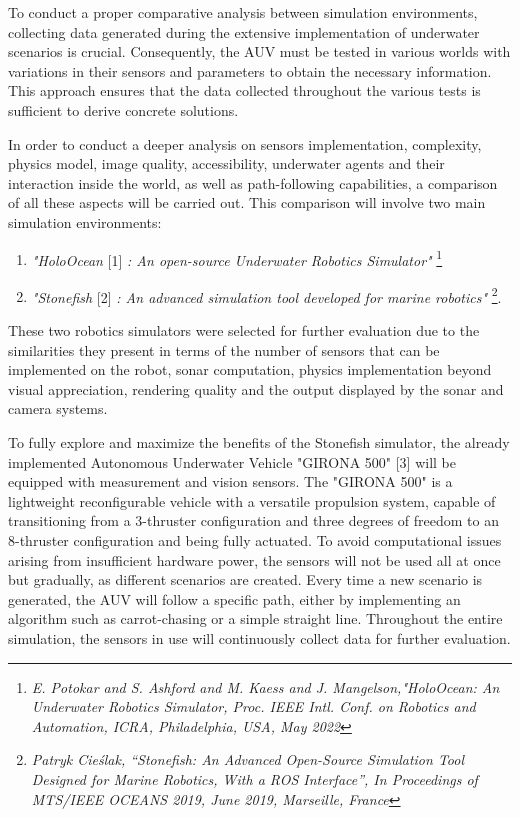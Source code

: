 \documentclass[]{article}
\begin{document}
	To conduct a proper comparative analysis between simulation environments, collecting data generated during the extensive implementation of underwater scenarios is crucial. Consequently, the AUV must be tested in various worlds with variations in their sensors and parameters to obtain the necessary information. This approach ensures that the data collected throughout the various tests is sufficient to derive concrete solutions.
	
	In order to conduct a deeper analysis on sensors implementation, complexity, physics model, image quality, accessibility, underwater agents and their interaction inside the world, as well as path-following capabilities, a comparison of all these aspects will be carried out. 
	This comparison will involve two main simulation environments: 
	
	
	\begin{enumerate}
		\item\textit{"HoloOcean} [1] \textit{: An open-source Underwater Robotics Simulator"} \footnote[1]{\textit{E. Potokar and S. Ashford and M. Kaess and J. Mangelson,"HoloOcean: An Underwater Robotics Simulator, Proc. IEEE Intl. Conf. on Robotics and Automation, ICRA, Philadelphia, USA, May 2022}}
		\item\textit{"Stonefish} [2] \textit{: An advanced simulation tool developed for marine robotics"} \footnote[2]{\textit{Patryk Cieślak, “Stonefish: An Advanced Open-Source Simulation Tool Designed for Marine Robotics, With a ROS Interface”, In Proceedings of MTS/IEEE OCEANS 2019, June 2019, Marseille, France}}.
	\end{enumerate}
	
	These two robotics simulators were selected for further evaluation due to the similarities they present in terms of the number of sensors that can be implemented on the robot, sonar computation, physics implementation beyond visual appreciation, rendering quality and the output displayed by the sonar and camera systems.
	
	To fully explore and maximize the benefits of the Stonefish simulator, the already implemented Autonomous Underwater Vehicle "GIRONA 500" [3] will be equipped with measurement and vision sensors. The "GIRONA 500" is a lightweight reconfigurable vehicle with a versatile propulsion system, capable of transitioning from a 3-thruster configuration and three degrees of freedom to an 8-thruster configuration and being fully actuated. To avoid computational issues arising from insufficient hardware power, the sensors will not be used all at once but gradually, as different scenarios are created. Every time a new scenario is generated, the AUV will follow a specific path, either by implementing an algorithm such as carrot-chasing or a simple straight line. Throughout the entire simulation, the sensors in use will continuously collect data for further evaluation.
	
\end{document}
